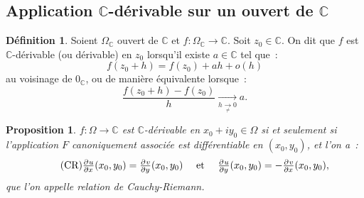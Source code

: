 \documentclass{report}
\newtheorem{prp}[thm]{Proposition}
\theoremstyle{definition}
\newtheorem{déf}[thm]{Définition}
\theoremstyle{remark}
\numberwithin{equation}{section}
\newcommand{\C}{\mathbb C}
\begin{document}
		\subsection{Application $\C$-dérivable sur un ouvert de $\C$}
			\begin{déf} Soient $\Omega_\C$ ouvert de $\C$ et $f : \Omega_\C \to \C$. Soit $z_0 \in \C$. On dit que $f$ est $\C$-dérivable (ou dérivable) en $z_0$
			lorsqu'il existe $a \in \C$ tel que~:
			\begin{equation}
				f(z_0+h) = f(z_0) + ah + o(h)
			\end{equation}
			au voisinage de $0_\C$, ou de manière équivalente lorsque~:
			\begin{equation}
				\frac {f(z_0+h)-f(z_0)}h \xrightarrow[h \underset {\neq}{\to} 0]{} a.
			\end{equation}
			\end{déf}

			\begin{prp} $f : \Omega \to \C$ est $\C$-dérivable en $x_0+iy_0 \in \Omega$ si et seulement si l'application $F$ canoniquement associée est différentiable en
			$(x_0, y_0)$, et l'on a~:
			\begin{equation}\label{eq:Cauchy-Riemann}\tag{CR}
				\pd ux(x_0, y_0) = \pd vy(x_0, y_0) \quad \text{ et } \quad \pd uy(x_0, y_0) = -\pd vx(x_0, y_0),
			\end{equation}
			que l'on appelle \textit{relation de Cauchy-Riemann}.
			\end{prp}
\end{document}
